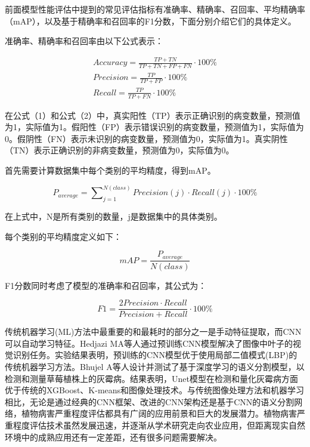 
前面模型性能评估中提到的常见评估指标有准确率、精确率、召回率、平均精确率（mAP），以及基于精确率和召回率的F1分数，下面分别介绍它们的具体定义。

准确率、精确率和召回率由以下公式表示：

\begin{align*} Accuracy = \frac{TP + TN}{{TP + TN + FP + FN}} \cdot 100\% \tag{1}\\ Precision = \frac{TP}{{TP + FP}} \cdot 100\% \tag{2}\\ Recall = \frac{TP}{{TP + FN}} \cdot 100\% \tag{3}\end{align*}

在公式（1）和公式（2）中，真实阳性（TP）表示正确识别的病变数量，预测值为1，实际值为1。假阳性（FP）表示错误识别的病变数量，预测值为1，实际值为0。假阴性（FN）表示未识别的病变数量，预测值为0，实际值为1。真实阴性（TN）表示正确识别的非病变数量，预测值为0，实际值为0。

首先需要计算数据集中每个类别的平均精度，得到mAP。

\begin{equation*} P_{average} = \sum\nolimits_{j = 1}^{{N\left( {class} \right)}} {Precision\left( j \right) \cdot Recall\left( j \right) \cdot 100\% }\tag{4}\end{equation*}

在上式中，N是所有类别的数量，j是数据集中的具体类别。

每个类别的平均精度定义如下：

\begin{equation*} mAP = \frac{{P_{average} }}{{N\left( {class} \right)}}\tag{5}\end{equation*}

F1分数同时考虑了模型的准确率和召回率，其公式为：

\begin{equation*} F1 = \frac{2Precision \cdot Recall}{{Precision + Recall}} \cdot 100\%\tag{6}\end{equation*}

传统机器学习(ML)方法中最重要的和最耗时的部分之一是手动特征提取，而CNN可以自动学习特征。Hedjazi MA等人通过预训练CNN模型解决了图像中叶子的视觉识别任务。实验结果表明，预训练的CNN模型优于使用局部二值模式(LBP)的传统机器学习方法。Bhujel A等人设计并测试了基于深度学习的语义分割模型，以检测和测量草莓植株上的灰霉病。结果表明，Unet模型在检测和量化灰霉病方面优于传统的XGBoost、K-means和图像处理技术。与传统图像处理方法和机器学习相比，无论是通过经典的CNN框架、改进的CNN架构还是基于CNN的语义分割网络，植物病害严重程度评估都具有广阔的应用前景和巨大的发展潜力。植物病害严重程度评估技术虽然发展迅速，并逐渐从学术研究走向农业应用，但距离现实自然环境中的成熟应用还有一定差距，还有很多问题需要解决。

